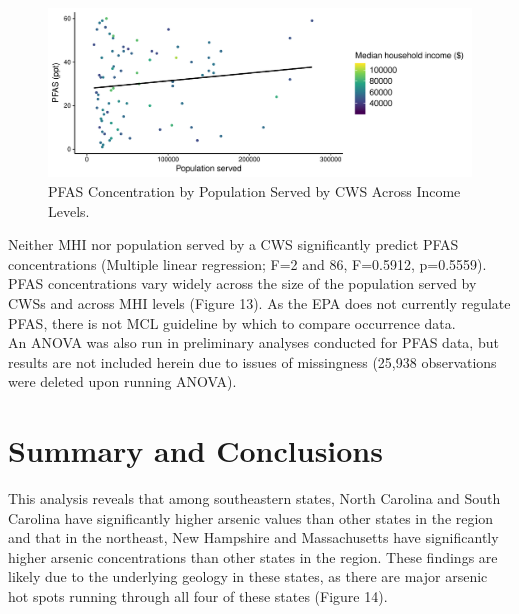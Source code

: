 \documentclass[12pt,]{article}
\begin{document}
\begin{figure}
\centering
\includegraphics{Project_Template_files/figure-latex/figs13-1.pdf}
\caption{PFAS Concentration by Population Served by CWS Across Income
Levels.}
\end{figure}

Neither MHI nor population served by a CWS significantly predict PFAS
concentrations (Multiple linear regression; F=2 and 86, F=0.5912,
p=0.5559). PFAS concentrations vary widely across the size of the
population served by CWSs and across MHI levels (Figure 13). As the EPA
does not currently regulate PFAS, there is not MCL guideline by which to
compare occurrence data.\\
An ANOVA was also run in preliminary analyses conducted for PFAS data,
but results are not included herein due to issues of missingness (25,938
observations were deleted upon running ANOVA).

\newpage

\hypertarget{summary-and-conclusions}{%
\section{Summary and Conclusions}\label{summary-and-conclusions}}

This analysis reveals that among southeastern states, North Carolina and
South Carolina have significantly higher arsenic values than other
states in the region and that in the northeast, New Hampshire and
Massachusetts have significantly higher arsenic concentrations than
other states in the region. These findings are likely due to the
underlying geology in these states, as there are major arsenic hot spots
running through all four of these states (Figure 14).
\end{document}
